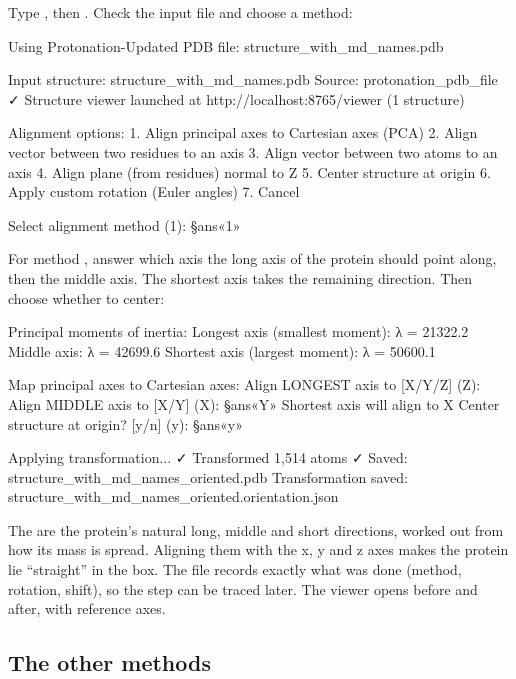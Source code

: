 \begin{steps}
  \item Type , then . Check the input file and choose a method:
\begin{screen}
Using Protonation-Updated PDB file: structure_with_md_names.pdb

Input structure: structure_with_md_names.pdb
Source: protonation_pdb_file
✓ Structure viewer launched at http://localhost:8765/viewer (1 structure)

Alignment options:
  1. Align principal axes to Cartesian axes (PCA)
  2. Align vector between two residues to an axis
  3. Align vector between two atoms to an axis
  4. Align plane (from residues) normal to Z
  5. Center structure at origin
  6. Apply custom rotation (Euler angles)
  7. Cancel

Select alignment method (1): §ans«1»
\end{screen}
  \item For method , answer which axis the long axis of the protein
        should point along, then the middle axis. The shortest axis takes the
        remaining direction. Then choose whether to center:
\begin{screen}
Principal moments of inertia:
  Longest axis  (smallest moment): λ = 21322.2
  Middle axis:                      λ = 42699.6
  Shortest axis (largest moment):   λ = 50600.1

Map principal axes to Cartesian axes:
Align LONGEST axis to [X/Y/Z] (Z):
Align MIDDLE axis to [X/Y] (X): §ans«Y»
Shortest axis will align to X
Center structure at origin? [y/n] (y): §ans«y»

Applying transformation...
✓ Transformed 1,514 atoms
✓ Saved: structure_with_md_names_oriented.pdb
Transformation saved: structure_with_md_names_oriented.orientation.json
\end{screen}
\end{steps}

The  are the protein's natural long, middle and short
directions, worked out from how its mass is spread. Aligning them with the x,
y and z axes makes the protein lie ``straight'' in the box. The
 file records exactly what was done (method, rotation,
shift), so the step can be traced later. The viewer opens before and after,
with reference axes.

\subsection{The other methods}

